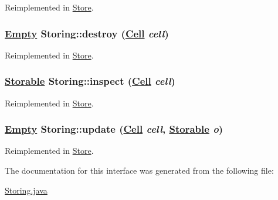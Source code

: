 Reimplemented in \hyperlink{classStore_a0}{Store}.\hypertarget{interfaceStoring_a1}{
\subsubsection[destroy]{\setlength{\rightskip}{0pt plus 5cm}\hyperlink{interfaceEmpty}{Empty} Storing::destroy (\hyperlink{interfaceCell}{Cell} {\em cell})}}
\label{interfaceStoring_a1}




Reimplemented in \hyperlink{classStore_a1}{Store}.\hypertarget{interfaceStoring_a3}{
\subsubsection[inspect]{\setlength{\rightskip}{0pt plus 5cm}\hyperlink{interfaceStorable}{Storable} Storing::inspect (\hyperlink{interfaceCell}{Cell} {\em cell})}}
\label{interfaceStoring_a3}




Reimplemented in \hyperlink{classStore_a3}{Store}.\hypertarget{interfaceStoring_a2}{
\subsubsection[update]{\setlength{\rightskip}{0pt plus 5cm}\hyperlink{interfaceEmpty}{Empty} Storing::update (\hyperlink{interfaceCell}{Cell} {\em cell}, \hyperlink{interfaceStorable}{Storable} {\em o})}}
\label{interfaceStoring_a2}




Reimplemented in \hyperlink{classStore_a2}{Store}.

The documentation for this interface was generated from the following file:\begin{CompactItemize}
\item 
\hyperlink{Storing_8java-source}{Storing.java}\end{CompactItemize}

